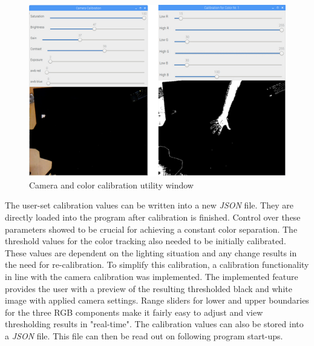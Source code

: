 \begin{figure}[H]
\includegraphics[width=\textwidth]{images/calib_windows.jpg}
\caption{Camera and color calibration utility window}
\label{fig:calibration_windows} 
\end{figure}
The user-set calibration values can be written into a new \textit{JSON} file. They are directly loaded into the program after calibration is finished. Control over these parameters showed to be crucial for achieving a constant color separation. The threshold values for the color tracking also needed to be initially calibrated. These values are dependent on the lighting situation and any change results in the need for re-calibration. To simplify this calibration, a calibration functionality in line with the camera calibration was implemented. The implemented feature provides the user with a preview of the resulting thresholded black and white image with applied camera settings. Range sliders for lower and upper boundaries for the three RGB components make it fairly easy to adjust and view thresholding results in "real-time". The calibration values can also be stored into a \textit{JSON} file. This file can then be read out on following program start-ups.
